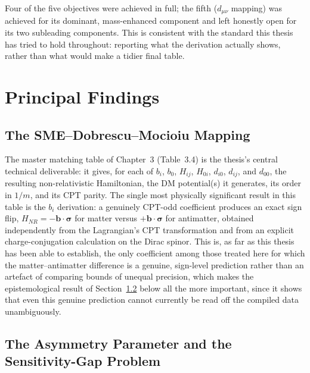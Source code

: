 \documentclass[main]{subfiles}
\begin{document}
Four of the five objectives were achieved in full; the fifth ($d_{\mu\nu}$
mapping) was achieved for its dominant, mass-enhanced component and left
honestly open for its two subleading components. This is consistent with
the standard this thesis has tried to hold throughout: reporting what the
derivation actually shows, rather than what would make a tidier final
table.

\section{Principal Findings}

\subsection{The SME--Dobrescu--Mocioiu Mapping}

The master matching table of Chapter~3 (Table~3.4) is the thesis's central
technical deliverable: it gives, for each of $b_i$, $b_0$, $H_{ij}$,
$H_{0i}$, $d_{i0}$, $d_{ij}$, and $d_{00}$, the resulting non-relativistic
Hamiltonian, the DM potential(s) it generates, its order in $1/m$, and its
CPT parity. The single most physically significant result in this table is
the $b_i$ derivation: a genuinely CPT-odd coefficient produces an exact
sign flip, $H_{NR}=-\mathbf b\cdot\boldsymbol\sigma$ for matter versus
$+\mathbf b\cdot\boldsymbol\sigma$ for antimatter, obtained independently
from the Lagrangian's CPT transformation and from an explicit
charge-conjugation calculation on the Dirac spinor. This is, as far as this
thesis has been able to establish, the only coefficient among those treated
here for which the matter--antimatter difference is a genuine, sign-level
prediction rather than an artefact of comparing bounds of unequal
precision, which makes the epistemological result of
Section~\ref{sec:findings-asymmetry} below all the more important, since it
shows that even this genuine prediction cannot currently be read off the
compiled data unambiguously.

\subsection{The Asymmetry Parameter and the Sensitivity-Gap Problem}
\label{sec:findings-asymmetry}
\end{document}
